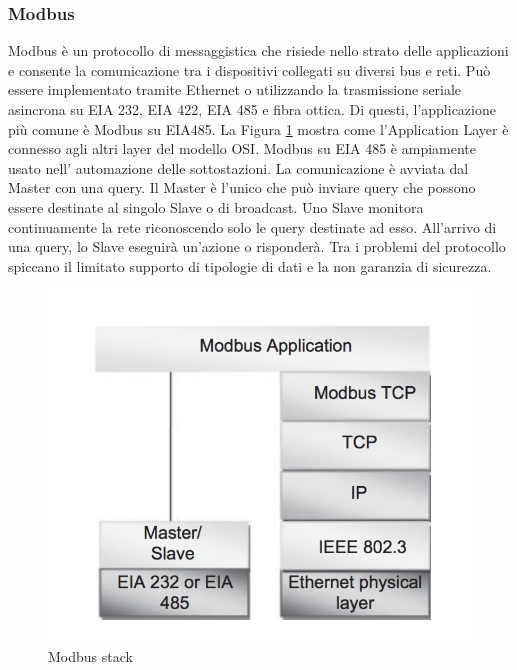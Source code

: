\subsubsection{Modbus}
Modbus è un protocollo di messaggistica che risiede nello strato delle applicazioni e consente la comunicazione tra i dispositivi collegati su diversi bus e reti. Può essere implementato tramite Ethernet o utilizzando la trasmissione seriale asincrona su EIA 232, EIA 422, EIA 485 e fibra ottica. Di questi, l'applicazione più comune è Modbus su EIA485. La Figura \ref{fig:modbus} mostra come l'Application Layer è connesso agli altri layer del modello OSI.
Modbus su EIA 485 è ampiamente usato nell' automazione delle sottostazioni. La comunicazione è avviata dal Master con una query. Il Master è l'unico che può inviare query che possono essere destinate al singolo Slave o di broadcast. Uno Slave monitora continuamente la rete riconoscendo solo le query destinate ad esso.  All'arrivo di una query, lo Slave eseguirà un'azione o risponderà. Tra i problemi del protocollo spiccano il limitato supporto di tipologie di dati e la non garanzia di sicurezza.
\begin{figure}[h]
	\centering
	\includegraphics[scale=0.350]{imgs/modbus.png}
	\caption{Modbus stack} \label{fig:modbus}
\end{figure}
